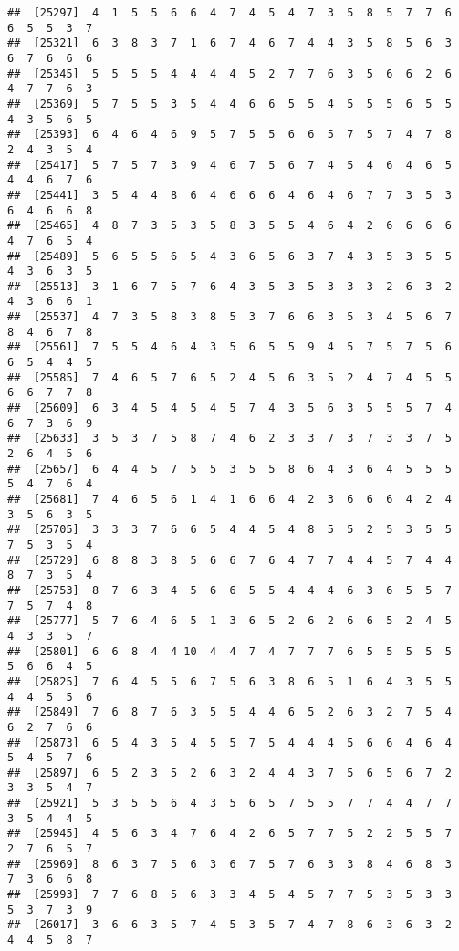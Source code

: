 \documentclass[
]{book}
\begin{document}
\begin{verbatim}
##  [25297]  4  1  5  5  6  6  4  7  4  5  4  7  3  5  8  5  7  7  6  6  5  5  3  7
##  [25321]  6  3  8  3  7  1  6  7  4  6  7  4  4  3  5  8  5  6  3  6  7  6  6  6
##  [25345]  5  5  5  5  4  4  4  4  5  2  7  7  6  3  5  6  6  2  6  4  7  7  6  3
##  [25369]  5  7  5  5  3  5  4  4  6  6  5  5  4  5  5  5  6  5  5  4  3  5  6  5
##  [25393]  6  4  6  4  6  9  5  7  5  5  6  6  5  7  5  7  4  7  8  2  4  3  5  4
##  [25417]  5  7  5  7  3  9  4  6  7  5  6  7  4  5  4  6  4  6  5  4  4  6  7  6
##  [25441]  3  5  4  4  8  6  4  6  6  6  4  6  4  6  7  7  3  5  3  6  4  6  6  8
##  [25465]  4  8  7  3  5  3  5  8  3  5  5  4  6  4  2  6  6  6  6  4  7  6  5  4
##  [25489]  5  6  5  5  6  5  4  3  6  5  6  3  7  4  3  5  3  5  5  4  3  6  3  5
##  [25513]  3  1  6  7  5  7  6  4  3  5  3  5  3  3  3  2  6  3  2  4  3  6  6  1
##  [25537]  4  7  3  5  8  3  8  5  3  7  6  6  3  5  3  4  5  6  7  8  4  6  7  8
##  [25561]  7  5  5  4  6  4  3  5  6  5  5  9  4  5  7  5  7  5  6  6  5  4  4  5
##  [25585]  7  4  6  5  7  6  5  2  4  5  6  3  5  2  4  7  4  5  5  6  6  7  7  8
##  [25609]  6  3  4  5  4  5  4  5  7  4  3  5  6  3  5  5  5  7  4  6  7  3  6  9
##  [25633]  3  5  3  7  5  8  7  4  6  2  3  3  7  3  7  3  3  7  5  2  6  4  5  6
##  [25657]  6  4  4  5  7  5  5  3  5  5  8  6  4  3  6  4  5  5  5  5  4  7  6  4
##  [25681]  7  4  6  5  6  1  4  1  6  6  4  2  3  6  6  6  4  2  4  3  5  6  3  5
##  [25705]  3  3  3  7  6  6  5  4  4  5  4  8  5  5  2  5  3  5  5  7  5  3  5  4
##  [25729]  6  8  8  3  8  5  6  6  7  6  4  7  7  4  4  5  7  4  4  8  7  3  5  4
##  [25753]  8  7  6  3  4  5  6  6  5  5  4  4  4  6  3  6  5  5  7  7  5  7  4  8
##  [25777]  5  7  6  4  6  5  1  3  6  5  2  6  2  6  6  5  2  4  5  4  3  3  5  7
##  [25801]  6  6  8  4  4 10  4  4  7  4  7  7  7  6  5  5  5  5  5  5  6  6  4  5
##  [25825]  7  6  4  5  5  6  7  5  6  3  8  6  5  1  6  4  3  5  5  4  4  5  5  6
##  [25849]  7  6  8  7  6  3  5  5  4  4  6  5  2  6  3  2  7  5  4  6  2  7  6  6
##  [25873]  6  5  4  3  5  4  5  5  7  5  4  4  4  5  6  6  4  6  4  5  4  5  7  6
##  [25897]  6  5  2  3  5  2  6  3  2  4  4  3  7  5  6  5  6  7  2  3  3  5  4  7
##  [25921]  5  3  5  5  6  4  3  5  6  5  7  5  5  7  7  4  4  7  7  3  5  4  4  5
##  [25945]  4  5  6  3  4  7  6  4  2  6  5  7  7  5  2  2  5  5  7  2  7  6  5  7
##  [25969]  8  6  3  7  5  6  3  6  7  5  7  6  3  3  8  4  6  8  3  7  3  6  6  8
##  [25993]  7  7  6  8  5  6  3  3  4  5  4  5  7  7  5  3  5  3  3  5  3  7  3  9
##  [26017]  3  6  6  3  5  7  4  5  3  5  7  4  7  8  6  3  6  3  2  4  4  5  8  7

\end{verbatim}
\end{document}
